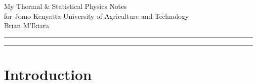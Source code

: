\documentclass[letterpaper, 11pt]{article}
\begin{document}
	\begin{center}
		\huge{My Thermal \& Statistical Physics Notes} \\
		\Large{for Jomo Kenyatta University of Agriculture and Technology} \\
		\Large{Brian M'Ikiara} \\
		\date{May 2024}
	\end{center}
	\rule{\textwidth}{0.5pt}
    \begin{abstract}
    \noindent\lipsum[1-2]
	\end{abstract}
	\rule{\textwidth}{0.5pt}
    \tableofcontents
    \section{Introduction}
    \lipsum[1-5]
\end{document}
